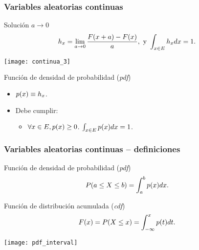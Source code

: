 \documentclass[table]{beamer}
\begin{document}
\begin{frame}
    \frametitle{Variables aleatorias continuas}
    \begin{block}{Solución $a \rightarrow 0$}
        \begin{equation*}
            h_{x} = \lim_{a \rightarrow 0} \frac{\FF{x + a} - \FF{x}}{a} , \text{ y }
            \int_{x \in E} h_{x} d x = 1 .
        \end{equation*}
    \end{block}
    \begin{center}
        \texttt{[image: continua\_3]}
    \end{center}
    \begin{block}{Función de densidad de probabilidad (\emph{pdf})}
        \begin{itemize}
            \item $\pdf{x} \equiv h_{x}$.
            \item Debe cumplir:
                \begin{itemize}
                    \item $\forall x \in E , \pdf{x} \geq 0$. $\int_{x \in E} \pdf{x} d x = 1$.
                    
                \end{itemize}
        \end{itemize}
    \end{block}
\end{frame}





\begin{frame}
    \frametitle{Variables aleatorias continuas -- definiciones}
    \begin{block}{Función de densidad de probabilidad (\emph{pdf})}
        \begin{equation*}
            \prob{a \leq X \leq b} = \int_{a}^{b} \pdf{x} d x .
        \end{equation*}
    \end{block}
    \begin{block}{Función de distribución acumulada (\emph{cdf})}
        \begin{equation*}
            \FF{x} = \prob{X \leq x} = \int_{- \infty}^{x} \pdf{t} d t .
        \end{equation*}
    \end{block}
    \begin{center}
        \texttt{[image: pdf\_interval]}
    \end{center}
\end{frame}
\end{document}
